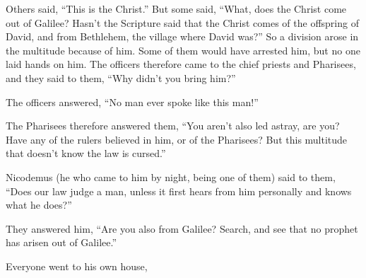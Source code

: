 {Others said, “This is the Christ.” But some said, “What, does the Christ come out of Galilee?
Hasn’t the Scripture said that the Christ comes of the offspring of David,
 and from Bethlehem, the village where David was?”
So a division arose in the multitude because of him.
Some of them would have arrested him, but no one laid hands on him.
The officers therefore came to the chief priests and Pharisees, and they said to them, “Why didn’t you bring him?”
\par }{\PP {}The officers answered, “No man ever spoke like this man!”
\par }{\PP {}The Pharisees therefore answered them, “You aren’t also led astray, are you?
Have any of the rulers believed in him, or of the Pharisees?
But this multitude that doesn’t know the law is cursed.”
\par }{\PP {}Nicodemus (he who came to him by night, being one of them) said to them,
“Does our law judge a man, unless it first hears from him personally and knows what he does?”
\par }{\PP {}They answered him, “Are you also from Galilee? Search, and see that no prophet has arisen out of Galilee.”
\par }{\PP {}Everyone went to his own house,

}
